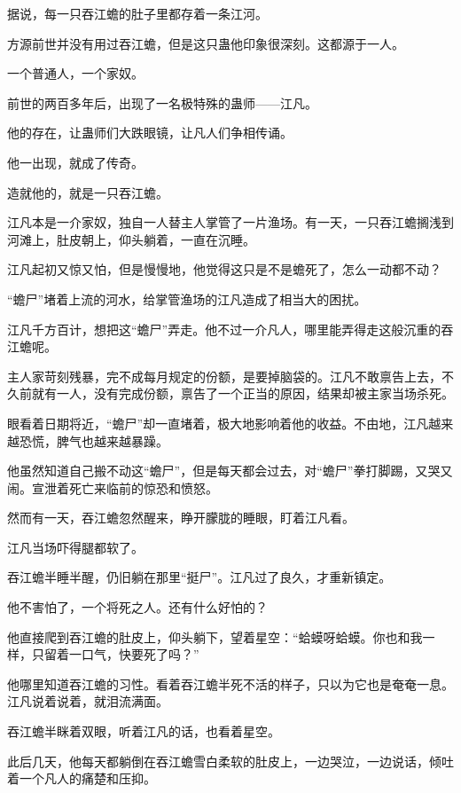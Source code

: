
\begin{this_body}

据说，每一只吞江蟾的肚子里都存着一条江河。

方源前世并没有用过吞江蟾，但是这只蛊他印象很深刻。这都源于一人。

一个普通人，一个家奴。

前世的两百多年后，出现了一名极特殊的蛊师——江凡。

他的存在，让蛊师们大跌眼镜，让凡人们争相传诵。

他一出现，就成了传奇。

造就他的，就是一只吞江蟾。

江凡本是一介家奴，独自一人替主人掌管了一片渔场。有一天，一只吞江蟾搁浅到河滩上，肚皮朝上，仰头躺着，一直在沉睡。

江凡起初又惊又怕，但是慢慢地，他觉得这只是不是蟾死了，怎么一动都不动？

“蟾尸”堵着上流的河水，给掌管渔场的江凡造成了相当大的困扰。

江凡千方百计，想把这“蟾尸”弄走。他不过一介凡人，哪里能弄得走这般沉重的吞江蟾呢。

主人家苛刻残暴，完不成每月规定的份额，是要掉脑袋的。江凡不敢禀告上去，不久前就有一人，没有完成份额，禀告了一个正当的原因，结果却被主家当场杀死。

眼看着日期将近，“蟾尸”却一直堵着，极大地影响着他的收益。不由地，江凡越来越恐慌，脾气也越来越暴躁。

他虽然知道自己搬不动这“蟾尸”，但是每天都会过去，对“蟾尸”拳打脚踢，又哭又闹。宣泄着死亡来临前的惊恐和愤怒。

然而有一天，吞江蟾忽然醒来，睁开朦胧的睡眼，盯着江凡看。

江凡当场吓得腿都软了。

吞江蟾半睡半醒，仍旧躺在那里“挺尸”。江凡过了良久，才重新镇定。

他不害怕了，一个将死之人。还有什么好怕的？

他直接爬到吞江蟾的肚皮上，仰头躺下，望着星空：“蛤蟆呀蛤蟆。你也和我一样，只留着一口气，快要死了吗？”

他哪里知道吞江蟾的习性。看着吞江蟾半死不活的样子，只以为它也是奄奄一息。江凡说着说着，就泪流满面。

吞江蟾半眯着双眼，听着江凡的话，也看着星空。

此后几天，他每天都躺倒在吞江蟾雪白柔软的肚皮上，一边哭泣，一边说话，倾吐着一个凡人的痛楚和压抑。


\end{this_body}
